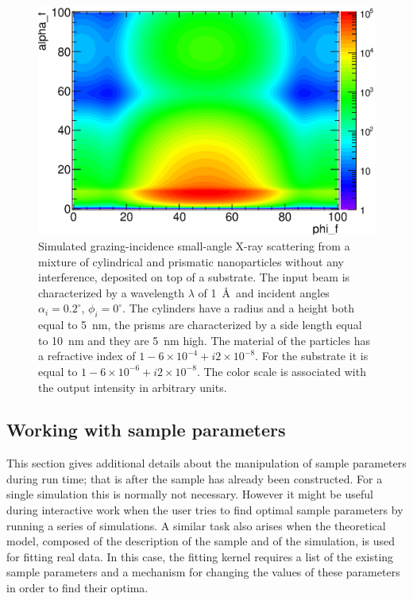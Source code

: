 \begin{figure}[htbp]
  \begin{center}
   \includegraphics[clip=true, width=120mm]{fig/gisasmap/Manual_ex1.eps}
  \end{center}
  \caption[Example 1: Simulated grazing-incidence small-angle X-ray scattering from a mixture of
cylindrical and prismatic nanoparticles without any interference, deposited on top
of a substrate]{Simulated grazing-incidence small-angle X-ray scattering from a mixture of
cylindrical and prismatic nanoparticles without any interference, deposited on top
of a substrate. The input beam is characterized by a wavelength
$\lambda$ of 1~\AA\ and incident angles $\alpha_i=0.2^{\circ}$, $\phi_i=0^{\circ}$. The
cylinders have a radius and a height both equal to 5~nm, the prisms
are characterized by a side length equal to 10~nm and they are 5~nm high. The
material of the particles has a refractive index of $1-6\times 10^{-4}+i2\times 10^{-8}$. For the substrate
it is equal to $1-6\times 10^{-6} +i2\times 10^{-8} $. The color scale
is associated with the output intensity in arbitrary units. }
\label{fig:output_ex1}
\end{figure}


\subsection{Working with sample parameters}
   \label{sec:WorkingWithSampleParameters}


This section gives additional details about the manipulation of sample parameters
during run time; that is after the sample has already been constructed.
For a single simulation this is normally not necessary. However it might be useful
during interactive work when the user tries to find optimal sample parameters by
running a series of simulations.
A similar task also arises when the theoretical model, composed of the
description of the sample and of the simulation, is used for fitting real data.
In this case, the fitting kernel requires a list of the existing sample parameters
and a mechanism for changing the values of these parameters in order to find
their optima.

